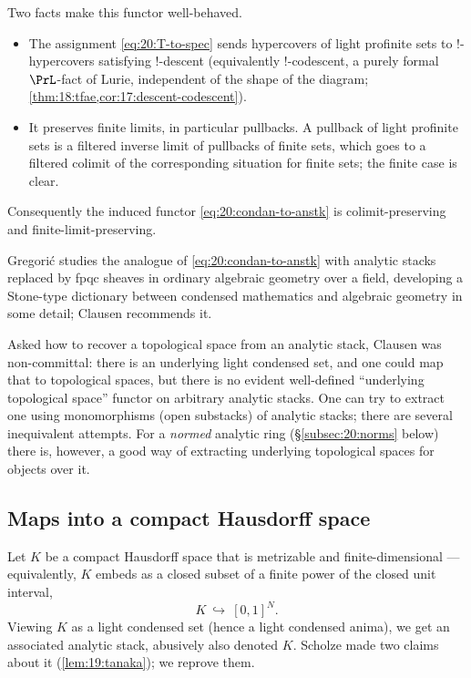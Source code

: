 Two facts make this functor well-behaved.
\begin{itemize}
\item The assignment \eqref{eq:20:T-to-spec} sends hypercovers of light
profinite sets to $!$-hypercovers satisfying $!$-descent (equivalently
$!$-codescent, a purely formal $\PrL$-fact of Lurie, independent of the shape
of the diagram; \cref{thm:18:tfae,cor:17:descent-codescent}).
\item It preserves finite limits, in particular pullbacks. A pullback of light
profinite sets is a filtered inverse limit of pullbacks of finite sets, which
goes to a filtered colimit of the corresponding situation for finite sets;
the finite case is clear.
\end{itemize}
Consequently the induced functor \eqref{eq:20:condan-to-anstk} is
colimit-preserving and finite-limit-preserving.

\begin{remark}
\label{rmk:20:gregoric}
Gregori\'c \cite{gregoric2024stonedualitycondensedmathematics} studies the
analogue of \eqref{eq:20:condan-to-anstk} with analytic stacks replaced by fpqc
sheaves in ordinary algebraic geometry over a field, developing a Stone-type
dictionary between condensed mathematics and algebraic geometry in some detail;
Clausen recommends it.
\end{remark}

\begin{remark}
\label{rmk:20:no-underlying-space}
Asked how to recover a topological space from an analytic stack, Clausen was
non-committal: there is an underlying light condensed set, and one could map
that to topological spaces, but there is no evident well-defined ``underlying
topological space'' functor on arbitrary analytic stacks. One can try to extract
one using monomorphisms (open substacks) of analytic stacks; there are several
inequivalent attempts. For a \emph{normed} analytic ring (\S\ref{subsec:20:norms}
below) there is, however, a good way of extracting underlying topological spaces
for objects over it.
\end{remark}

\subsection{Maps into a compact Hausdorff space}
\label{subsec:20:compact-hausdorff}

Let $K$ be a compact Hausdorff space that is metrizable and finite-dimensional
--- equivalently, $K$ embeds as a closed subset of a finite power of the closed
unit interval,
\begin{equation*}
K\ \hookrightarrow\ [0,1]^N .
\end{equation*}
Viewing $K$ as a light condensed set (hence a light condensed anima), we get an
associated analytic stack, abusively also denoted $K$. Scholze made two claims
about it (\cref{lem:19:tanaka}); we reprove them.

